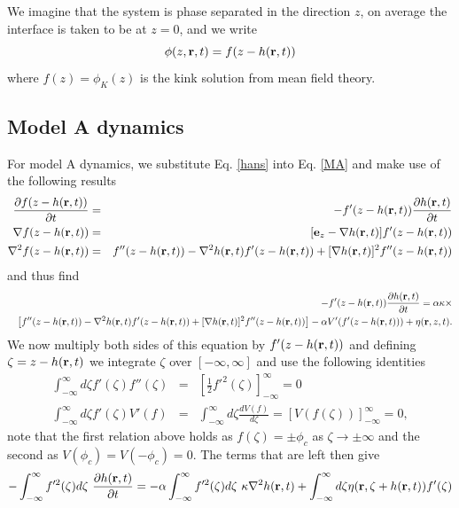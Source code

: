 We imagine that the system is phase separated in the direction  $z$, on average the interface is taken to be at $z=0$, and we write
\begin{equation}
    \phi(z,{\bf r},t) = f(z-h({\bf r},t))\label{hans}
\end{equation}
where $f(z)=\phi_K(z)$ is the kink solution from mean field theory.

    \subsection{Model A dynamics}

For model A dynamics, we substitute Eq. \eqref{hans} into Eq. \eqref{MA} and make use of the following results
\begin{eqnarray}
\frac{\partial f(z-h({\bf r},t))}{\partial t}&=& -f'(z-h({\bf r},t))\frac{\partial h({\bf r},t)}{\partial t}\\
\nabla f(z-h({\bf r},t))&=& [{\bf e}_z-\nabla h({\bf r},t)]f'(z-h({\bf r},t))  \\
\nabla^2 f(z-h({\bf r},t))&=& f''(z-h({\bf r},t))- \nabla^2 h({\bf r},t)f'(z-h({\bf r},t))+ [\nabla h({\bf r},t)]^2 
f''(z-h({\bf r},t))
\end{eqnarray}
and thus find
\begin{eqnarray}
&&-f'(z-h({\bf r},t))\frac{\partial h({\bf r},t)}{\partial t}= \alpha\kappa\times\\ &&\left[f''(z-h({\bf r},t))- \nabla^2 h({\bf r},t)f'(z-h({\bf r},t))+ [\nabla h({\bf r},t)]^2 
f''(z-h({\bf r},t))\right] - \alpha V'(f'(z-h({\bf r},t))) + \eta({\bf r},z,t).
\end{eqnarray}
We now multiply both sides of this equation by $f'(z-h({\bf r},t))$ and defining $\zeta=z-h({\bf r},t)$ we integrate  $\zeta$ over $[-\infty,\infty]$ and use the following identities
\begin{eqnarray}
\int_{-\infty}^\infty d\zeta f'(\zeta)f''(\zeta) &=& [\frac{1}{2}f'^2(\zeta)]_{-\infty}^\infty =0\\
\int_{-\infty}^\infty d\zeta f'(\zeta) V'(f) &=& \int_{-\infty}^\infty d\zeta\frac{d V(f)}{d\zeta}= [V(f(\zeta))]_{-\infty}^\infty=0,
\end{eqnarray} 
note that the first relation above holds as $f(\zeta)=\pm \phi_c$ as $\zeta\to\pm \infty$ and the second as
$V(\phi_c)=V(-\phi_c)=0$.
The terms that are left then give
\begin{equation}
    -\int_{-\infty}^\infty f'^2(\zeta)d\zeta\ \frac{\partial h(\br,t)}{\partial t}
    = -\alpha\int_{-\infty}^\infty f'^2(\zeta)d\zeta \ \kappa \nabla^2 h(\br,t) + \int_{-\infty}^\infty d\zeta \eta(\br,\zeta+ h(\br,t))f'(\zeta)
\end{equation}
